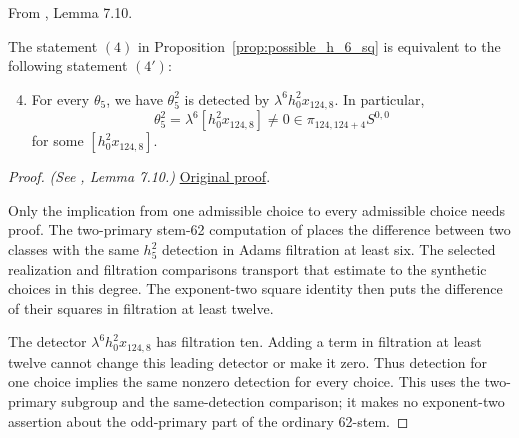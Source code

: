 \begin{lemma}
\label{paper:7.10}
From \cite{LWX126}, Lemma 7.10.\par
\label{lem:equistate4}
    The statement $(4)$ in Proposition~\ref{prop:possible_h_6_sq} is equivalent to the following statement $(4')$:
    \begin{enumerate}[label=(\arabic*')]\setcounter{enumi}{3} 
    \item For every $\theta_5$, we have $\theta_5^2$ is detected by $\lambda^6 h_0^2x_{124,8}$. In particular, 
    $$\theta_5^2 = \lambda^6 [h_0^2x_{124,8}] \neq 0 \in \pi_{124,124+4}S^{0,0}$$
    for some $[h_0^2x_{124,8}]$.
    \end{enumerate}


\end{lemma}
\begin{proof}
\textit{(See \cite{LWX126}, Lemma 7.10.)} \href{paper/main.tex.html#L2230}{Original proof}.

Only the implication from one admissible choice to every admissible choice needs proof. The two-primary stem-62 computation of \cite{IWX} places the difference between two classes with the same $h_5^2$ detection in Adams filtration at least six. The selected realization and filtration comparisons transport that estimate to the synthetic choices in this degree. The exponent-two square identity then puts the difference of their squares in filtration at least twelve.

The detector $\lambda^6h_0^2x_{124,8}$ has filtration ten. Adding a term in filtration at least twelve cannot change this leading detector or make it zero. Thus detection for one choice implies the same nonzero detection for every choice. This uses the two-primary subgroup and the same-detection comparison; it makes no exponent-two assertion about the odd-primary part of the ordinary 62-stem.
\end{proof}

